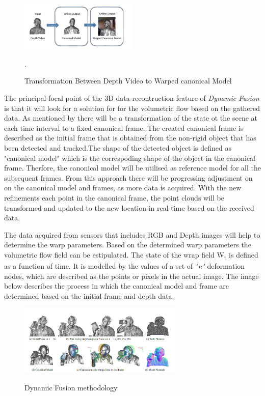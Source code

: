 \documentclass[12pt]{report}
\begin{document}
\vspace{5mm}

\begin{figure} %
    \centering
    \includegraphics[width=0.5\textwidth]{IMG_0073.png}
    \caption{Transformation Between Depth Video to Warped canonical Model} \cite[]{newcombe_fox_seitz_2015}.
\end{figure}
The principal  focal point of the 3D data recontruction feature of \textit{Dynamic Fusion}  is that it will look for a solution for for the volumetric flow based on the gathered data.
As mentioned by  there will be a transformation of the state ot the scene at each time interval to a fixed canonical frame.
The created  canonical frame is described as the initial frame that is obtained from the non-rigid object that has been detected and tracked.The shape of the detected object is defined as "canonical model" which is the correspoding shape of the object in the canonical frame. 
Therfore, the canonical model will be utilised as reference model for all the subsequent frames. From this approach there will be progressing adjustment on on the canonical model and frames, as more data is acquired.
With the new refinements each point in the canonical frame, the point clouds will be transformed and updated to the new location in real time based on the received data.

The data acquired from sensors that includes RGB and Depth images will help to determine the warp parameters. Based on the determined warp parameters the volumetric flow field can be estipulated.
The state of the wrap field W\textsubscript{t} is defined as a function of time. It is modelled by the values of a set of \textit{"n"} deformation nodes, which are described as the points or pixels in the actual image.
The image below describes the process in which the canonical model and frame are determined based on the initial frame and depth data. 
\begin{figure}{}%
    \centering
    \includegraphics[width=0.7\textwidth]{dynamicfusion2.png}
   \caption{Dynamic Fusion methodology}\cite[]{newcombe_fox_seitz_2015} 
\end{figure}
\end{document}
